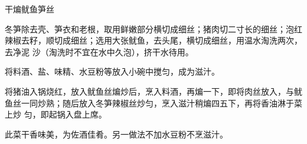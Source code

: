 %
%
%
%
%
%
%
\begin{recipe}{干煸鱿鱼笋丝}

\ingredients


\preparation

\step 冬笋除去壳、笋衣和老根，取用鲜嫩部分横切成细丝；猪肉切二寸长的细丝；泡红
辣椒去籽，顺切成细丝；选用大张鱿鱼，去头尾，横切成细丝，用温水淘洗两次，去净泥
沙（淘洗时不宜在水中久泡），挤干水待用。

\step 将料酒、盐、味精、水豆粉等放入小碗中搅匀，成为滋汁。

\step 将猪油入锅烧红，放入鱿鱼丝煸炒后，烹入料酒，再煸一下，即将肉丝放入，与鱿
鱼丝一同炒熟；随后放入冬笋辣椒丝炒匀，烹入滋汁稍煸四五下，再将香油淋于菜上炒
匀，即起锅入盘上席。

\features

此菜干香味美，为佐酒佳肴。另一做法不加水豆粉不烹滋汁。

\end{recipe}

